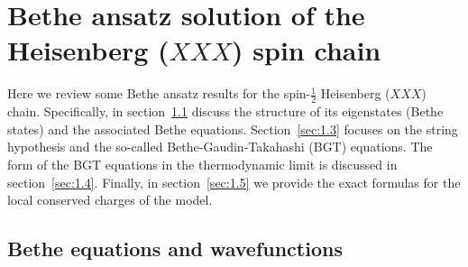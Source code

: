\documentclass[11pt]{iopart}
\begin{document}
%
%


%
%

\section{Bethe ansatz solution of the Heisenberg ($XXX$) spin chain}
\label{sec:1}

Here we review some Bethe ansatz results for the spin-$\frac{1}{2}$ Heisenberg 
($XXX$) chain. Specifically, in section~\ref{sec:1.2} discuss the structure of  
its eigenstates (Bethe states) and the associated Bethe equations. 
Section~\ref{sec:1.3} focuses on the string hypothesis 
and the so-called Bethe-Gaudin-Takahashi (BGT) equations. The form of the 
BGT equations in the thermodynamic limit is discussed in section~\ref{sec:1.4}. 
Finally, in section~\ref{sec:1.5} we provide the exact formulas for the 
local conserved charges of the model. 





\subsection{Bethe equations and wavefunctions}
\label{sec:1.2}
\end{document}
